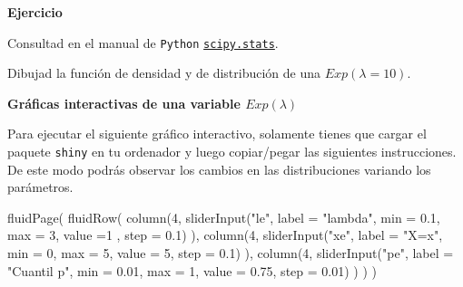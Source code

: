 \documentclass[
  letterpaper,
  DIV=11,
  numbers=noendperiod]{scrreprt}
\newenvironment{Shaded}{\begin{snugshade}}{\end{snugshade}}
\newcommand{\AttributeTok}[1]{\textcolor[rgb]{0.40,0.45,0.13}{#1}}
\newcommand{\DecValTok}[1]{\textcolor[rgb]{0.68,0.00,0.00}{#1}}
\newcommand{\FloatTok}[1]{\textcolor[rgb]{0.68,0.00,0.00}{#1}}
\newcommand{\FunctionTok}[1]{\textcolor[rgb]{0.28,0.35,0.67}{#1}}
\newcommand{\NormalTok}[1]{\textcolor[rgb]{0.00,0.23,0.31}{#1}}
\newcommand{\StringTok}[1]{\textcolor[rgb]{0.13,0.47,0.30}{#1}}
\begin{document}
\textbf{Ejercicio}

Consultad en el manual de \texttt{Python}
\href{https://docs.scipy.org/doc/scipy/reference/generated/scipy.stats.expon.html}{\texttt{scipy.stats}}.

Dibujad la función de densidad y de distribución de una
\(Exp(\lambda=10).\)

\textbf{Gráficas interactivas de una variable \(Exp(\lambda)\)}

Para ejecutar el siguiente gráfico interactivo, solamente tienes que
cargar el paquete \texttt{shiny} en tu ordenador y luego copiar/pegar
las siguientes instrucciones. De este modo podrás observar los cambios
en las distribuciones variando los parámetros.

\begin{Shaded}
\begin{Highlighting}[]
\FunctionTok{fluidPage}\NormalTok{(}
\FunctionTok{fluidRow}\NormalTok{(}
  \FunctionTok{column}\NormalTok{(}\DecValTok{4}\NormalTok{,}
         \FunctionTok{sliderInput}\NormalTok{(}\StringTok{"le"}\NormalTok{, }\AttributeTok{label =} \StringTok{"lambda"}\NormalTok{,}
              \AttributeTok{min =} \FloatTok{0.1}\NormalTok{, }\AttributeTok{max =} \DecValTok{3}\NormalTok{, }\AttributeTok{value =}\DecValTok{1}\NormalTok{ , }\AttributeTok{step =} \FloatTok{0.1}\NormalTok{)}
\NormalTok{         ),}
  \FunctionTok{column}\NormalTok{(}\DecValTok{4}\NormalTok{,}
          \FunctionTok{sliderInput}\NormalTok{(}\StringTok{"xe"}\NormalTok{, }\AttributeTok{label =} \StringTok{"X=x"}\NormalTok{,}
                     \AttributeTok{min =} \DecValTok{0}\NormalTok{, }\AttributeTok{max =} \DecValTok{5}\NormalTok{, }\AttributeTok{value =} \DecValTok{5}\NormalTok{, }\AttributeTok{step =} \FloatTok{0.1}\NormalTok{)}
\NormalTok{         ),}
  \FunctionTok{column}\NormalTok{(}\DecValTok{4}\NormalTok{,}
          \FunctionTok{sliderInput}\NormalTok{(}\StringTok{"pe"}\NormalTok{, }\AttributeTok{label =} \StringTok{"Cuantil p"}\NormalTok{,}
                     \AttributeTok{min =} \FloatTok{0.01}\NormalTok{, }\AttributeTok{max =} \DecValTok{1}\NormalTok{, }\AttributeTok{value =} \FloatTok{0.75}\NormalTok{, }\AttributeTok{step =} \FloatTok{0.01}\NormalTok{)}
\NormalTok{         )}
\NormalTok{)}
\NormalTok{)}


\end{Highlighting}
\end{Shaded}
\end{document}
